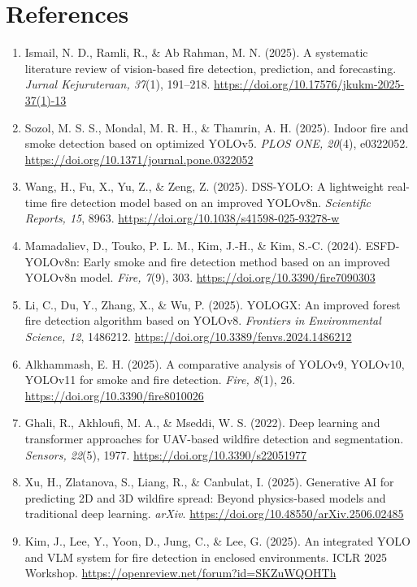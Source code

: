 \documentclass[12pt,a4paper]{article}
\begin{document}
\section{References}
\begin{enumerate}
  \item\label{ismail2025survey} Ismail, N. D., Ramli, R., \& Ab Rahman, M. N. (2025). A systematic literature review of vision-based fire detection, prediction, and forecasting. \emph{Jurnal Kejuruteraan, 37}(1), 191--218. \url{https://doi.org/10.17576/jkukm-2025-37(1)-13}
  \item\label{sozol2025yolov5} Sozol, M. S. S., Mondal, M. R. H., \& Thamrin, A. H. (2025). Indoor fire and smoke detection based on optimized YOLOv5. \emph{PLOS ONE, 20}(4), e0322052. \url{https://doi.org/10.1371/journal.pone.0322052}
  \item\label{wang2025dssyolo} Wang, H., Fu, X., Yu, Z., \& Zeng, Z. (2025). DSS-YOLO: A lightweight real-time fire detection model based on an improved YOLOv8n. \emph{Scientific Reports, 15}, 8963. \url{https://doi.org/10.1038/s41598-025-93278-w}
  \item\label{mamadaliev2024esfd} Mamadaliev, D., Touko, P. L. M., Kim, J.-H., \& Kim, S.-C. (2024). ESFD-YOLOv8n: Early smoke and fire detection method based on an improved YOLOv8n model. \emph{Fire, 7}(9), 303. \url{https://doi.org/10.3390/fire7090303}
  \item\label{li2025yologx} Li, C., Du, Y., Zhang, X., \& Wu, P. (2025). YOLOGX: An improved forest fire detection algorithm based on YOLOv8. \emph{Frontiers in Environmental Science, 12}, 1486212. \url{https://doi.org/10.3389/fenvs.2024.1486212}
  \item\label{alkhammash2025compare} Alkhammash, E. H. (2025). A comparative analysis of YOLOv9, YOLOv10, YOLOv11 for smoke and fire detection. \emph{Fire, 8}(1), 26. \url{https://doi.org/10.3390/fire8010026}
  \item\label{ghali2022uav} Ghali, R., Akhloufi, M. A., \& Mseddi, W. S. (2022). Deep learning and transformer approaches for UAV-based wildfire detection and segmentation. \emph{Sensors, 22}(5), 1977. \url{https://doi.org/10.3390/s22051977}
  \item\label{xu2025genai} Xu, H., Zlatanova, S., Liang, R., \& Canbulat, I. (2025). Generative AI for predicting 2D and 3D wildfire spread: Beyond physics-based models and traditional deep learning. \emph{arXiv}. \url{https://doi.org/10.48550/arXiv.2506.02485}
  \item\label{kim2025vlm} Kim, J., Lee, Y., Yoon, D., Jung, C., \& Lee, G. (2025). An integrated YOLO and VLM system for fire detection in enclosed environments. ICLR 2025 Workshop. \url{https://openreview.net/forum?id=SKZuWQOHTh}

\end{enumerate}
\end{document}
